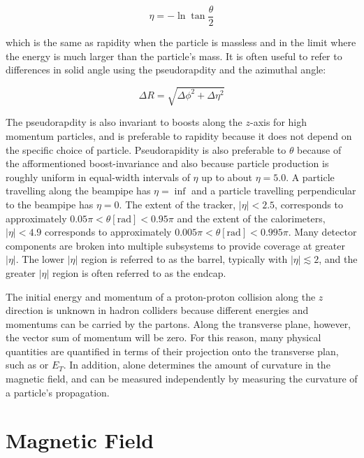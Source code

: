 \begin{equation}\label{eq:pseudorapidity}
\eta = - \ln \tan \frac{\theta}{2}
\end{equation}

\noindent which is the same as rapidity when the particle is massless and in the limit where the energy is much larger than the particle's mass.
It is often useful to refer to differences in solid angle using the pseudorapdity and the azimuthal angle:

\begin{equation}\label{eq:deltar}
\Delta R = \sqrt{\Delta \phi^2 + \Delta \eta^2}
\end{equation}


The pseudorapdity is also invariant to boosts along the $z$-axis for high momentum particles, and is preferable to rapidity because it does not depend on the specific choice of particle.
Pseudorapidity is also preferable to $\theta$ because of the afformentioned boost-invariance and also because particle production is roughly uniform in equal-width intervals of $\eta$ up to about $\eta = 5.0$. 
A particle travelling along the beampipe has $\eta = \inf$ and a particle travelling perpendicular to the beampipe has $\eta = 0$.
The extent of the tracker, $|\eta| < 2.5$, corresponds to approximately $0.05 \pi < \theta [\mathrm{rad}] < 0.95 \pi$ and the extent of the calorimeters, $|\eta| < 4.9$ corresponds to approximately $0.005 \pi < \theta [\mathrm{rad}] < 0.995 \pi$.
Many detector components are broken into multiple subsystems to provide coverage at greater $|\eta|$.
The lower $|\eta|$ region is referred to as the barrel, typically with $|\eta| \lesssim 2$, and the greater $|\eta|$ region is often referred to as the endcap.

The initial energy and momentum of a proton-proton collision along the $z$ direction is unknown in hadron colliders because different energies and momentums can be carried by the partons.
Along the transverse plane, however, the vector sum of momentum will be zero.
For this reason, many physical quantities are quantified in terms of their projection onto the transverse plan, such as \pt or $E_T$.
In addition, \pt alone determines the amount of curvature in the magnetic field, and can be measured independently by measuring the curvature of a particle's propagation.


\section{Magnetic Field}

